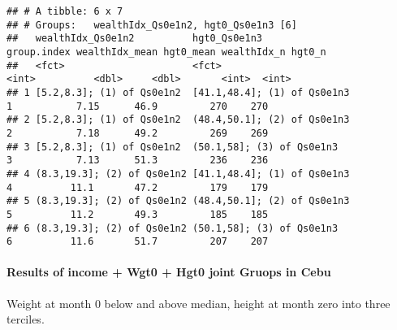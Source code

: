 \documentclass[
]{book}
\newenvironment{Shaded}{\begin{snugshade}}{\end{snugshade}}
\newcommand{\CommentTok}[1]{\textcolor[rgb]{0.56,0.35,0.01}{\textit{#1}}}
\newcommand{\DataTypeTok}[1]{\textcolor[rgb]{0.13,0.29,0.53}{#1}}
\newcommand{\DecValTok}[1]{\textcolor[rgb]{0.00,0.00,0.81}{#1}}
\newcommand{\FloatTok}[1]{\textcolor[rgb]{0.00,0.00,0.81}{#1}}
\newcommand{\KeywordTok}[1]{\textcolor[rgb]{0.13,0.29,0.53}{\textbf{#1}}}
\newcommand{\NormalTok}[1]{#1}
\newcommand{\OperatorTok}[1]{\textcolor[rgb]{0.81,0.36,0.00}{\textbf{#1}}}
\newcommand{\OtherTok}[1]{\textcolor[rgb]{0.56,0.35,0.01}{#1}}
\newcommand{\StringTok}[1]{\textcolor[rgb]{0.31,0.60,0.02}{#1}}
\begin{document}
\begin{verbatim}
## # A tibble: 6 x 7
## # Groups:   wealthIdx_Qs0e1n2, hgt0_Qs0e1n3 [6]
##   wealthIdx_Qs0e1n2          hgt0_Qs0e1n3                group.index wealthIdx_mean hgt0_mean wealthIdx_n hgt0_n
##   <fct>                      <fct>                             <int>          <dbl>     <dbl>       <int>  <int>
## 1 [5.2,8.3]; (1) of Qs0e1n2  [41.1,48.4]; (1) of Qs0e1n3           1           7.15      46.9         270    270
## 2 [5.2,8.3]; (1) of Qs0e1n2  (48.4,50.1]; (2) of Qs0e1n3           2           7.18      49.2         269    269
## 3 [5.2,8.3]; (1) of Qs0e1n2  (50.1,58]; (3) of Qs0e1n3             3           7.13      51.3         236    236
## 4 (8.3,19.3]; (2) of Qs0e1n2 [41.1,48.4]; (1) of Qs0e1n3           4          11.1       47.2         179    179
## 5 (8.3,19.3]; (2) of Qs0e1n2 (48.4,50.1]; (2) of Qs0e1n3           5          11.2       49.3         185    185
## 6 (8.3,19.3]; (2) of Qs0e1n2 (50.1,58]; (3) of Qs0e1n3             6          11.6       51.7         207    207
\end{verbatim}

\hypertarget{results-of-income-wgt0-hgt0-joint-gruops-in-cebu}{%
\paragraph{Results of income + Wgt0 + Hgt0 joint Gruops in Cebu}\label{results-of-income-wgt0-hgt0-joint-gruops-in-cebu}}

Weight at month 0 below and above median, height at month zero into three terciles.

\begin{Shaded}
\end{Shaded}
\end{document}

